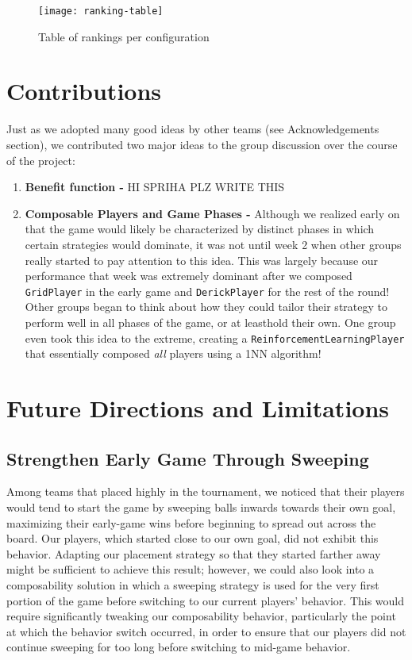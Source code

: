 \documentclass[
10pt, %
letterpaper, %
oneside, %
headinclude,footinclude, %
english
]{article}
\begin{document}
\begin{figure}[h]
\centering 
\texttt{[image: ranking-table]} 
\caption[Table of rankings per configuration]{Table of rankings per configuration}
\label{fig:gallery2} 
\end{figure}

\section{Contributions}

Just as we adopted many good ideas by other teams (see Acknowledgements section), we contributed two major ideas to the group discussion over the course of the project:

\begin{enumerate}
  \item \textbf{Benefit function - } HI SPRIHA PLZ WRITE THIS
  \item \textbf{Composable Players and Game Phases - } Although we realized early on that the game would likely be characterized by distinct phases in which certain strategies would dominate, it was not until week 2 when other groups really started to pay attention to this idea. This was largely because our performance that week was extremely dominant after we composed \texttt{GridPlayer} in the early game and \texttt{DerickPlayer} for the rest of the round! Other groups began to think about how they could tailor their strategy to perform well in all phases of the game, or at leasthold their own. One group even took this idea to the extreme, creating a \texttt{ReinforcementLearningPlayer} that essentially composed \textit{all} players using a 1NN algorithm!
\end{enumerate}

\section{Future Directions and Limitations}

\subsection{Strengthen Early Game Through Sweeping}
Among teams that placed highly in the tournament, we noticed that their players would tend to start the game by sweeping balls inwards towards their own goal, maximizing their early-game wins before beginning to spread out across the board. Our players, which started close to our own goal, did not exhibit this behavior. Adapting our placement strategy so that they started farther away might be sufficient to achieve this result; however, we could also look into a composability solution in which a sweeping strategy is used for the very first portion of the game before switching to our current players' behavior. This would require significantly tweaking our composability behavior, particularly the point at which the behavior switch occurred, in order to ensure that our players did not continue sweeping for too long before switching to mid-game behavior.
\end{document}
